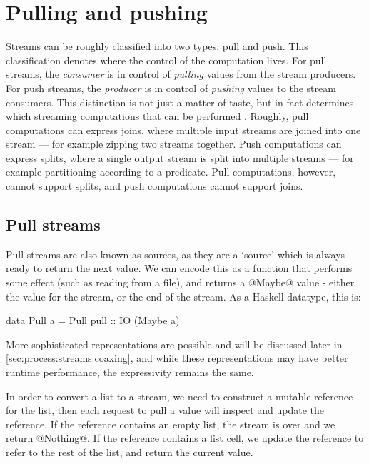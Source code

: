 \chapter{Pulling and pushing}
\label{chapter:process:streams}

Streams can be roughly classified into two types: pull and push.
This classification denotes where the control of the computation lives.
For pull streams, the \emph{consumer} is in control of \emph{pulling} values from the stream producers.
For push streams, the \emph{producer} is in control of \emph{pushing} values to the stream consumers.
This distinction is not just a matter of taste, but in fact determines which streaming computations that can be performed \citep{kay2009you}.
Roughly, pull computations can express joins, where multiple input streams are joined into one stream --- for example zipping two streams together.
Push computations can express splits, where a single output stream is split into multiple streams --- for example partitioning according to a predicate.
Pull computations, however, cannot support splits, and push computations cannot support joins.

\section{Pull streams}
Pull streams are also known as sources, as they are a `source' which is always ready to return the next value.
We can encode this as a function that performs some effect (such as reading from a file), and returns a @Maybe@ value - either the value for the stream, or the end of the stream.
As a Haskell datatype, this is:

\begin{code}
data Pull a
  = Pull
  { pull :: IO (Maybe a) }
\end{code}

More sophisticated representations are possible and will be discussed later in \autoref{sec:process:streams:coaxing}, and while these representations may have better runtime performance, the expressivity remains the same.

In order to convert a list to a stream, we need to construct a mutable reference for the list, then each request to pull a value will inspect and update the reference.
If the reference contains an empty list, the stream is over and we return @Nothing@. If the reference contains a list cell, we update the reference to refer to the rest of the list, and return the current value.

